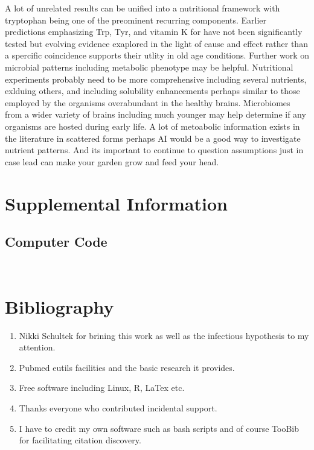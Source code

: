 \documentclass[aps,secnumarabic,balancelastpage,amsmath,amssymb,nofootinbib]{revtex4}
\newcommand{\mjmbasename}{\jobname}
\newcommand{\mjmaddbio}{mjm_tr,releases,dailysnapx}
\begin{document}
A lot of unrelated results can be unified into a nutritional framework
with tryptophan being one of the preominent recurring components.
Earlier predictions emphasizing Trp, Tyr, and vitamin K
for \mjmdisease  have not been significantly tested but 
evolving evidence exaplored in the light of cause and effect
rather than a spercific coincidence supports their utlity
in old age conditions. 
Further work on microbial patterns including
metabolic phenotype may be helpful. Nutritional experiments probably
need to be more comprehensive including several nutrients, exlduing
others, and including solubility enhancements perhaps similar
to those employed by the organisms overabundant in the healthy brains.  
Microbiomes from a wider variety of brains including much younger
may help determine if any organisms are hosted during early life.
A lot of metoabolic information exists in the literature in
scattered forms perhaps AI would be a good way to investigate
nutrient patterns. 
And its important to continue to question assumptions just in 
case lead can make your garden grow and feed your head.

\section{Supplemental Information}

\subsection{Computer Code}


\begin{lstlisting}


\end{lstlisting}
\section{Bibliography}






\begin{acknowledgments} 

% 
\begin{enumerate}
\item Nikki Schultek for brining this work \cite{Schultek_Nikki_Schultek_LinkedIn_2023} as well as the infectious hypothesis to my attention. 
\item Pubmed eutils facilities and the basic research it provides. 
\item Free software including Linux, R, LaTex  etc.
\item Thanks everyone who contributed incidental support. 
\item I have to credit my own software such as bash scripts
 and of course TooBib\cite{mmarchywka-MJM-2021-002-v0.1.1-rg} for facilitating citation discovery. 
\end{enumerate}

\end{acknowledgments}
\end{document}
